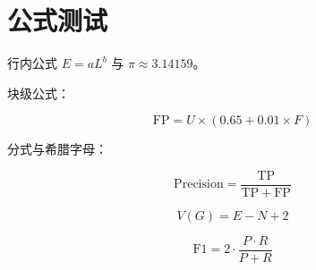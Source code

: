 \section{公式测试}\label{ux516cux5f0fux6d4bux8bd5}

行内公式 \(E=aL^b\) 与 \(\pi\approx3.14159\)。

块级公式：

\[\mathrm{FP} = U \times (0.65 + 0.01 \times F)\]

分式与希腊字母：

\[\mathrm{Precision}=\frac{\mathrm{TP}}{\mathrm{TP}+\mathrm{FP}}\]

\[V(G) = E - N + 2\]

\[\mathrm{F1}=2\cdot\frac{P\cdot R}{P+R}\]
